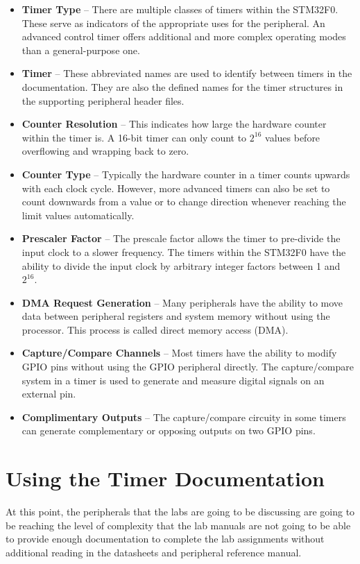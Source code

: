 \documentclass[11pt,fleqn]{book} %
\begin{document}
        \begin{itemize}
            \item \textbf{Timer Type} -- There are multiple classes of timers within the STM32F0. These serve as indicators of the appropriate uses for the peripheral. An advanced control timer offers additional and more complex operating modes than a general-purpose one. 
            \item \textbf{Timer} -- These abbreviated names are used to identify between timers in the documentation. They are also the defined names for the timer structures in the supporting peripheral header files. 
            \item \textbf{Counter Resolution} -- This indicates how large the hardware counter within the timer is. A 16-bit timer can only count to $2^{16}$ values before overflowing and wrapping back to zero. 
            \item \textbf{Counter Type} -- Typically the hardware counter in a timer counts upwards with each clock cycle. However, more advanced timers can also be set to count downwards from a value or to change direction whenever reaching the limit values automatically. 
            \item \textbf{Prescaler Factor} -- The prescale factor allows the timer to pre-divide the input clock to a slower frequency. The timers within the STM32F0 have the ability to divide the input clock by arbitrary integer factors between 1 and $2^{16}$.
            \item \textbf{DMA Request Generation} -- Many peripherals have the ability to move data between peripheral registers and system memory without using the processor. This process is called direct memory access (DMA).
            \item \textbf{Capture/Compare Channels} -- Most timers have the ability to modify GPIO pins without using the GPIO peripheral directly. The capture/compare system in a timer is used to generate and measure digital signals on an external pin. 
            \item \textbf{Complimentary Outputs} -- The capture/compare circuity in some timers can generate complementary or opposing outputs on two GPIO pins. 
        \end{itemize}

\section{Using the Timer Documentation}
    At this point, the peripherals that the labs are going to be discussing are going to be reaching the level of complexity that the lab manuals are not going to be able to provide enough documentation to complete the lab assignments without additional reading in the datasheets and peripheral reference manual. 
    
\end{document}
